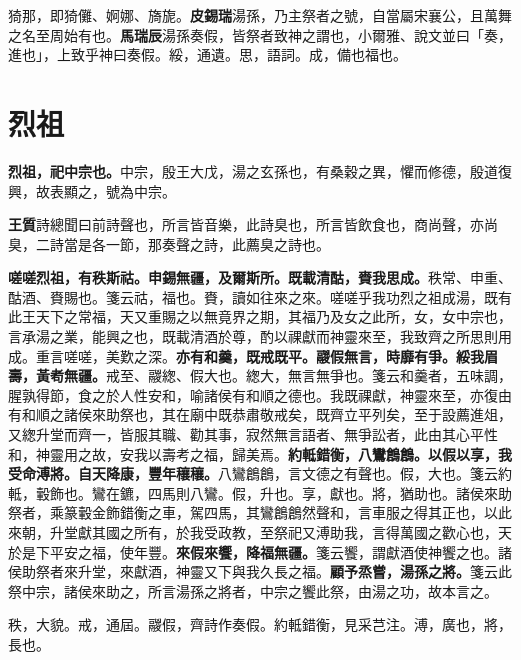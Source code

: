 \begin{quoting}猗那，即猗儺、婀娜、旖旎。\textbf{皮錫瑞}湯孫，乃主祭者之號，自當屬宋襄公，且萬舞之名至周始有也。\textbf{馬瑞辰}湯孫奏假，皆祭者致神之謂也，小爾雅、說文並曰「奏，進也」，上致乎神曰奏假。綏，通遺。思，語詞。成，備也福也。\end{quoting}

\section{烈祖}


\textbf{烈祖，祀中宗也。}{\footnotesize 中宗，殷王大戊，湯之玄孫也，有桑穀之異，懼而修德，殷道復興，故表顯之，號為中宗。}

\begin{quoting}\textbf{王質}詩總聞曰前詩聲也，所言皆音樂，此詩臭也，所言皆飲食也，商尚聲，亦尚臭，二詩當是各一節，那奏聲之詩，此薦臭之詩也。\end{quoting}

\textbf{嗟嗟烈祖，有秩斯祜。申錫無疆，及爾斯所。既載清酤，賚我思成。}{\footnotesize 秩常、申重、酤酒、賚賜也。箋云祜，福也。賚，讀如往來之來。嗟嗟乎我功烈之祖成湯，既有此王天下之常福，天又重賜之以無竟界之期，其福乃及女之此所，女，女中宗也，言承湯之業，能興之也，既載清酒於尊，酌以祼獻而神靈來至，我致齊之所思則用成。重言嗟嗟，美歎之深。}\textbf{亦有和羹，既戒既平。鬷假無言，時靡有爭。綏我眉壽，黃耇無疆。}{\footnotesize 戒至、鬷緫、假大也。緫大，無言無爭也。箋云和羹者，五味調，腥孰得節，食之於人性安和，喻諸侯有和順之德也。我既祼獻，神靈來至，亦復由有和順之諸侯來助祭也，其在廟中既恭肅敬戒矣，既齊立平列矣，至于設薦進俎，又緫升堂而齊一，皆服其職、勸其事，寂然無言語者、無爭訟者，此由其心平性和，神靈用之故，安我以壽考之福，歸美焉。}\textbf{約軧錯衡，八鸞鶬鶬。以假以享，我受命溥將。自天降康，豐年穰穰。}{\footnotesize 八鸞鶬鶬，言文德之有聲也。假，大也。箋云約軧，轂飾也。鸞在鑣，四馬則八鸞。假，升也。享，獻也。將，猶助也。諸侯來助祭者，乘篆轂金飾錯衡之車，駕四馬，其鸞鶬鶬然聲和，言車服之得其正也，以此來朝，升堂獻其國之所有，於我受政教，至祭祀又溥助我，言得萬國之歡心也，天於是下平安之福，使年豐。}\textbf{來假來饗，降福無疆。}{\footnotesize 箋云饗，謂獻酒使神饗之也。諸侯助祭者來升堂，來獻酒，神靈又下與我久長之福。}\textbf{顧予烝嘗，湯孫之將。}{\footnotesize 箋云此祭中宗，諸侯來助之，所言湯孫之將者，中宗之饗此祭，由湯之功，故本言之。}

\begin{quoting}秩，大貌。戒，通屆。鬷假，齊詩作奏假。約軧錯衡，見采芑注。溥，廣也，將，長也。\end{quoting}


